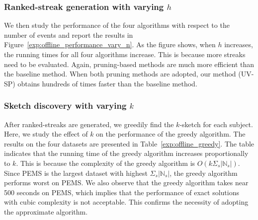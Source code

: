 \subsubsection{Ranked-streak generation with varying $h$}
We then study the performance of the four algorithms with respect to the number of events and report the results 
in Figure~\ref{exp:offline_performance_vary_n}. As the figure shows, when $h$ increases, 
the running times for all four algorithms increase. This is because more streaks need to be evaluated. 
Again, pruning-based methods are much more efficient than the baseline method. When both pruning methods are adopted, our method (UV-SP) obtains hundreds of times faster than the baseline method.

%

\subsubsection{Sketch discovery with varying $k$}
After ranked-streaks are generated, we greedily find the $k$-sketch for each subject. 
Here, we study the effect of $k$ on the performance of the greedy algorithm. The results on the four datasets are presented in Table~\ref{exp:offline_greedy}. The table indicates that the running time of the greedy algorithm 
increases proportionally to $k$.
%
This is because the complexity of the greedy algorithm is $O(k\Sigma_s|\mathbb{N}_s|)$. Since PEMS is the largest dataset with highest $\Sigma_s|\mathbb{N}_s|$, the greedy algorithm performs worst on PEMS. We also observe that the greedy algorithm takes near 500 seconds on PEMS, which implies that the performance of exact solutions with cubic complexity is not acceptable. This confirms the necessity of adopting the approximate algorithm.

